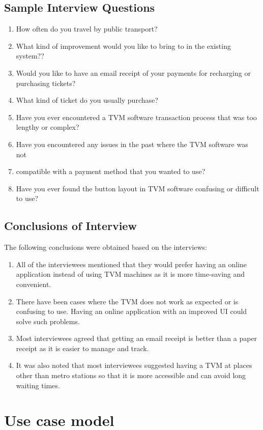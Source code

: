\documentclass[a4paper,12pt]{report}
\begin{document}
\section{Sample Interview Questions}
\begin{enumerate}
    \item How often do you travel by public transport?
    \item What kind of improvement would you like to bring to in the existing system??
    \item Would you like to have an email receipt of your payments for recharging or purchasing tickets?
    \item What kind of ticket do you usually purchase?
    \item Have you ever encountered a TVM software transaction process that was too lengthy or complex?
    \item Have you encountered any issues in the past where the TVM software was not \item compatible with a payment method that you wanted to use?
    \item Have you ever found the button layout in TVM software confusing or difficult to use?
    
\end{enumerate}

\section{Conclusions of Interview}
The following conclusions were obtained based on the interviews:

\begin{enumerate}
    \item All of the interviewees mentioned that they would prefer having an online application instead of using TVM machines as it is more time-saving and convenient.
    \item There have been cases where the TVM does not work as expected or is confusing to use. Having an online application with an improved UI could solve such problems. 
    \item Most interviewees agreed that getting an email receipt is better than a paper receipt as it is easier to manage and track. 
    \item It was also noted that most interviewees suggested having a TVM at places other than metro stations so that it is more accessible and can avoid long waiting times. 
\end{enumerate}
\chapter{Use case model}
\end{document}
